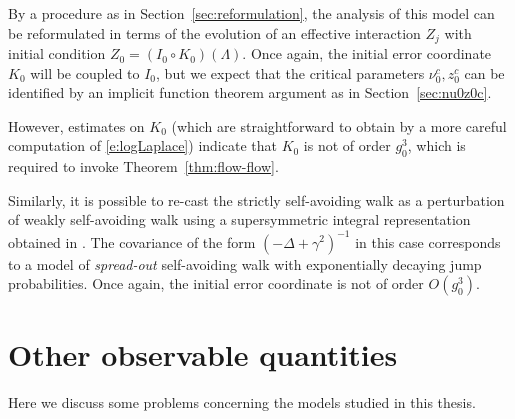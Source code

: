 By a procedure as in Section~\ref{sec:reformulation}, the analysis of this model
can be reformulated in terms of the evolution of an effective interaction $Z_j$
with initial condition $Z_0 = (I_0 \circ K_0)(\Lambda)$. Once again, the initial
error coordinate $K_0$ will be coupled to $I_0$, but we expect that the critical
parameters $\nu_0^c, z_0^c$ can be identified by an implicit function theorem
argument as in Section~\ref{sec:nu0z0c}.

However, estimates on $K_0$ (which are straightforward
to obtain by a more careful computation of \eqref{e:logLaplace}) indicate that
$K_0$ is not of order $g_0^3$, which is required to invoke Theorem~\ref{thm:flow-flow}.

\begin{rk}
Similarly, it is possible to re-cast the strictly self-avoiding walk as a
perturbation of weakly self-avoiding walk using a supersymmetric integral
representation obtained in \cite{BIS09}. The covariance of the form
$(-\Delta + \gamma^2)^{-1}$ in this case corresponds to a model of \emph{spread-out}
self-avoiding walk with exponentially decaying jump probabilities. Once again,
the initial error coordinate is not of order $O(g_0^3)$.
\end{rk}


\section{Other observable quantities}

Here we discuss some  problems concerning the models studied in this thesis.

